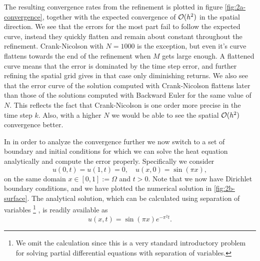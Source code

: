 The resulting convergence rates from the refinement is plotted in figure \ref{fig:2a-convergence}, 
together with the expected convergence of $\mathcal{O}(h^2)$ in the spatial direction. 
We see that the errors for the most part fail to follow the expected curve, 
instead they quickly flatten and remain about constant throughout the refinement. 
Crank-Nicolson with $N=1000$ is the exception, 
but even it's curve flattens towards the end of the refinement when $M$ gets large enough. 
A flattened curve means that the error is dominated by the time step error, 
and further refining the spatial grid gives in that case only diminishing returns. 
We also see that the error curve of the solution computed with Crank-Nicolson flattens later than those of the solutions computed with Backward Euler for the same value of $N$. 
This reflects the fact that Crank-Nicolson is one order more precise in the time step $k$. 
Also, 
with a higher $N$ we would be able to see the spatial $\mathcal{O}(h^2)$ convergence better. 

In in order to analyze the convergence further we now switch to a set of boundary and initial conditions for which we can solve the heat equation analytically and compute the error properly. 
Specifically we consider 
\begin{equation}
    u(0,t) = u(1,t) = 0, \quad u(x,0) = \sin(\pi x), 
    \label{eq:2b-manufactured}
\end{equation}
on the same domain $x \in [0,1] := \Omega$ and $t > 0$. 
Note that we now have Dirichlet boundary conditions, 
and we have plotted the numerical solution in \ref{fig:2b-surface}. 
The analytical solution, 
which can be calculated using separation of variables
\footnote{
    We omit the calculation since this is a very standard introductory problem for solving 
    partial differential equations with separation of variables. 
} \cite{Kreyszig}, 
is readily available as
\begin{equation}
    u(x,t) = \sin(\pi x)  e^{- \pi^2 t}.
\end{equation}

